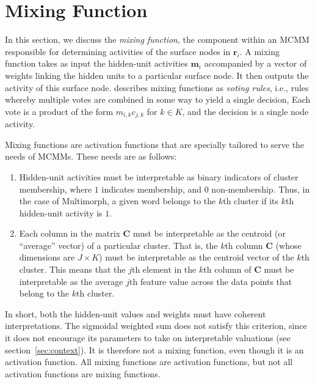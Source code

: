 \section{Mixing Function}
\label{sec:mixing-function}

In this section, we discuss the \emph{mixing function}, 
the component within an MCMM responsible for determining 
activities of the surface nodes in $\textbf{r}_i$.
A mixing function takes as input the hidden-unit activities $\textbf{m}_i$ accompanied by a vector of weights  
linking the hidden units to a particular surface node. It then outputs the activity 
of this surface node. 
\citet{saund:94} describes mixing functions as
\emph{voting rules}, i.e., rules whereby multiple votes are combined in some way to yield a single decision, 
Each vote is a product of the form $m_{i,k}c_{j,k}$ for $k \in K$, and the decision is a single node activity. 

Mixing functions are 
activation functions that are specially tailored to serve the needs of MCMMs. 
These needs are as follows:
\begin{enumerate}
\item Hidden-unit activities 
must be interpretable as binary indicators of cluster membership, where $1$ 
indicates membership, and $0$ non-membership. Thus, in the case of 
Multimorph, a given word belongs to the 
$k$th cluster if its $k$th hidden-unit activity is $1$.
\item Each column in the matrix $\textbf{C}$ must be interpretable as the centroid 
(or ``average'' vector) of a particular cluster. That is, the $k$th column 
$\textbf{C}$ (whose dimensions are $J \times K$) must be interpretable as the centroid vector of the $k$th cluster. This means that the $j$th element in the $k$th column of $\textbf{C}$ must be interpretable as the average $j$th feature value across the data points that belong to the $k$th cluster. 

\end{enumerate}
In short, both the hidden-unit values and weights must have coherent interpretations. 
The sigmoidal weighted sum
does not satisfy this criterion, since it does not encourage its 
parameters to take on interpretable valuations (see section~\ref{sec:context}). It is therefore 
not a mixing function, even though it is an activation function.  All mixing functions
are activation functions, but not all activation functions are mixing functions.


